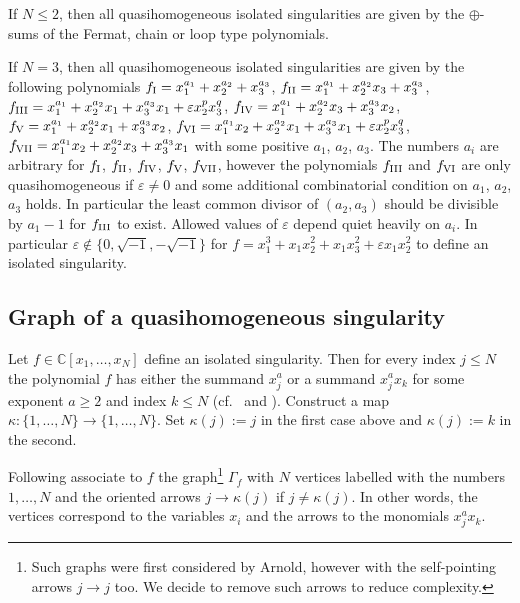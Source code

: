 \documentclass[pdftex]{sigma}
\numberwithin{equation}{section}
\newcommand{\CC}{{\mathbb{C}}}
\newcommand{\eps}{\varepsilon}
\begin{document}
\begin{Example}
If $N \le 2$, then all quasihomogeneous isolated singularities are given by the $\oplus$-sums of the Fermat, chain or loop type polynomials.
\end{Example}

\begin{Example}\label{ex: N=3 quasihomogeneous}
If $N = 3$, then all quasihomogeneous isolated singularities are given by the following polynomials $f_{\rm I} = x_1^{a_1} + x_2^{a_2}+ x_3^{a_3}$, $f_{\rm II} = x_1^{a_1} + x_2^{a_2}x_3 + x_3^{a_3}$, $f_{\rm III} = x_1^{a_1} + x_2^{a_2}x_1+ x_3^{a_3}x_1 + \eps x_2^{p}x_3^q$, $f_{\rm IV} = x_1^{a_1} + x_2^{a_2}x_3 + x_3^{a_3}x_2$,
	$f_{\rm V} = x_1^{a_1} + x_2^{a_2}x_1 + x_3^{a_3}x_2$, $f_{\rm VI} = x_1^{a_1}x_2 + x_2^{a_2}x_1 + x_3^{a_3}x_1 + \eps x_2^p x_3^q$, $f_{\rm VII} = x_1^{a_1}x_2 + x_2^{a_2}x_3 + x_3^{a_3}x_1$ with some positive $a_1$, $a_2$, $a_3$. The numbers $a_i$ are arbitrary for $f_{\rm I}$, $f_{\rm II}$, $f_{\rm IV}$, $f_{\rm V}$, $f_{\rm VII}$, however the polynomials $f_{\rm III}$ and $f_{\rm VI}$ are only quasihomogeneous if $\eps \neq 0$ and some additional combinatorial condition on $a_1$, $a_2$, $a_3$ holds. In particular the least common divisor of $(a_2,a_3)$ should be divisible by $a_1-1$ for $f_{\rm III}$ to exist. Allowed values of $\eps$ depend quiet heavily on $a_i$. In particular $\eps \not\in\lbrace 0,\sqrt{-1},-\sqrt{-1}\rbrace $ for $f = x_1^3 + x_1x_2^2 + x_1x_3^2 + \eps x_1x_2^2$ to define an isolated singularity.
\end{Example}

\subsection{Graph of a quasihomogeneous singularity}
Let $f \in \CC[x_1,\dots,x_N]$ define an isolated singularity. Then for every index $j \le N$ the polynomial $f$ has either the summand $x_j^{a}$ or a summand $x_j^ax_k$ for some exponent $a \ge 2$ and index $k \le N$ (cf.\ \cite[Korollar~1.6]{S71} and \cite[Theorem~2.2]{HK}). Construct a map $\kappa\colon \lbrace 1,\dots,N\rbrace \to \lbrace 1,\dots,N\rbrace$. Set $\kappa(j):=j$ in the first case above and $\kappa(j) := k$ in the second.

Following \cite[Section 3]{HK} associate to $f$ the graph\footnote{Such graphs were first considered by Arnold, however with the self-pointing arrows $j \to j$ too. We decide to remove such arrows to reduce complexity.}
$\Gamma_f$ with $N$ vertices labelled with the numbers $1,\dots,N$ and the oriented arrows $j \to \kappa(j)$ if $j \neq \kappa(j)$. In other words, the vertices correspond to the variables $x_i$ and the arrows to the monomials $x_j^ax_k$.
\end{document}

